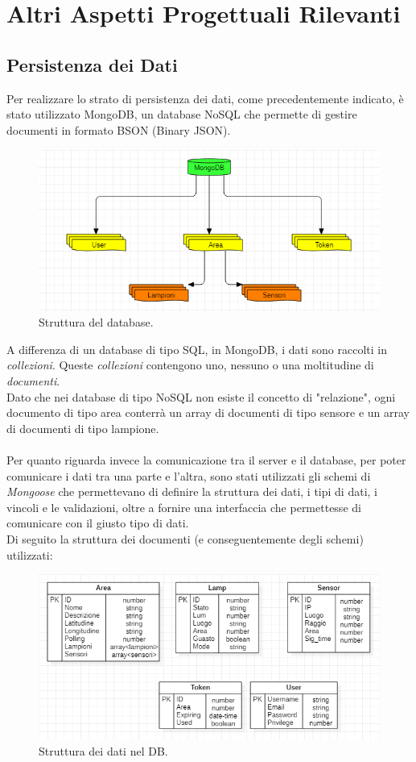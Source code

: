 \documentclass[a4paper, 11pt]{article}
\begin{document}
\newpage
\section{Altri Aspetti Progettuali Rilevanti}
\subsection{Persistenza dei Dati}
Per realizzare lo strato di persistenza dei dati, come precedentemente indicato, è stato utilizzato MongoDB, un database NoSQL che permette di gestire documenti in formato BSON (Binary JSON).\\
\begin{figure}[H]
    \centering
    \includegraphics[width=\textwidth]{Persistenza}
    \caption{Struttura del database.}
\end{figure}
A differenza di un database di tipo SQL, in MongoDB, i dati sono raccolti in \textit{collezioni}. Queste \textit{collezioni} contengono uno, nessuno o una moltitudine di \textit{documenti}.\\
Dato che nei database di tipo NoSQL non esiste il concetto di "relazione", ogni documento di tipo area conterrà un array di documenti di tipo sensore e un array di documenti di tipo lampione.\\\\
Per quanto riguarda invece la comunicazione tra il server e il database, per poter comunicare i dati tra una parte e l'altra, sono stati utilizzati gli schemi di \textit{Mongoose} che permettevano di definire la struttura dei dati, i tipi di dati, i vincoli e le validazioni, oltre a fornire una interfaccia che permettesse di comunicare con il giusto tipo di dati.\\
Di seguito la struttura dei documenti (e conseguentemente degli schemi) utilizzati:
\begin{figure}[H]
    \centering
    \includegraphics[width=\textwidth]{SchemaDB}
    \caption{Struttura dei dati nel DB.}
\end{figure}
\end{document}

